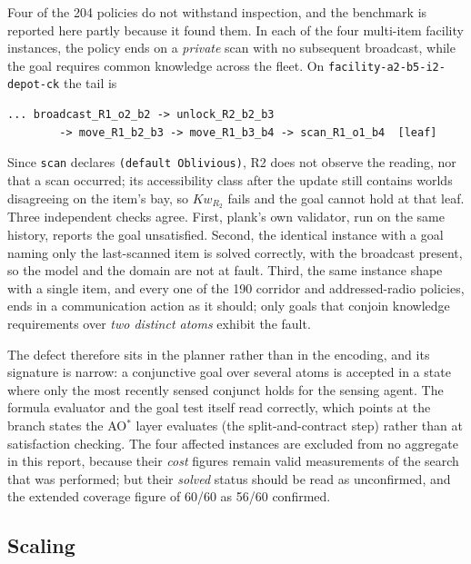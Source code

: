 \documentclass[11pt,a4paper]{article}
\theoremstyle{definition}
\newcommand{\Kw}[1]{\mathit{Kw}_{#1}}
\begin{document}
Four of the 204 policies do not withstand inspection, and the benchmark is
reported here partly because it found them. In each of the four multi-item
facility instances, the policy ends on a \emph{private} scan with no
subsequent broadcast, while the goal requires common knowledge across the
fleet. On \texttt{facility-a2-b5-i2-depot-ck} the tail is

\begin{lstlisting}[caption={The suspect tail: R1 senses privately and the
policy terminates, although the goal demands that R2 know as well.}]
    ... broadcast_R1_o2_b2 -> unlock_R2_b2_b3
        -> move_R1_b2_b3 -> move_R1_b3_b4 -> scan_R1_o1_b4  [leaf]
\end{lstlisting}

Since \texttt{scan} declares \texttt{(default Oblivious)}, R2 does not observe
the reading, nor that a scan occurred; its accessibility class after the update
still contains worlds disagreeing on the item's bay, so $\Kw{R_2}$ fails and
the goal cannot hold at that leaf. Three independent checks agree. First,
\textsf{plank}'s own validator, run on the same history, reports the goal
unsatisfied. Second, the identical instance with a goal naming only the
last-scanned item is solved correctly, with the broadcast present, so the
model and the domain are not at fault. Third, the same instance shape with a
single item, and every one of the 190 corridor and addressed-radio policies,
ends in a communication action as it should; only goals that conjoin
knowledge requirements over \emph{two distinct atoms} exhibit the fault.

The defect therefore sits in the planner rather than in the encoding, and its
signature is narrow: a conjunctive goal over several atoms is accepted in a
state where only the most recently sensed conjunct holds for the sensing agent.
The formula evaluator and the goal test itself read correctly, which points at
the branch states the AO$^\ast$ layer evaluates (the split-and-contract
step) rather than at satisfaction checking. The four affected instances are
excluded from no aggregate in this report, because their \emph{cost} figures
remain valid measurements of the search that was performed; but their
\emph{solved} status should be read as unconfirmed, and the extended coverage
figure of 60/60 as 56/60 confirmed.

\subsection{Scaling}
\end{document}
